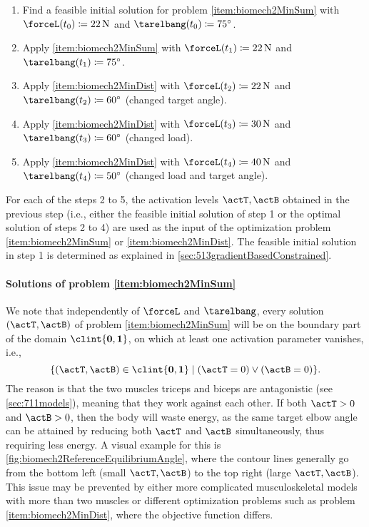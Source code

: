 \begin{enumerate}
  \item
  Find a feasible initial solution for problem \ref{item:biomech2MinSum}
  with $\forceL(t_0) \ceq \SI{22}{\newton}$ and
  $\tarelbang(t_0) \ceq \ang{75}$.
  
  \item
  Apply \ref{item:biomech2MinSum} with $\forceL(t_1) \ceq \SI{22}{\newton}$ and
  $\tarelbang(t_1) \ceq \ang{75}$.
  
  \item
  Apply \ref{item:biomech2MinDist} with $\forceL(t_2) \ceq \SI{22}{\newton}$ and
  $\tarelbang(t_2) \ceq \ang{60}$ (changed target angle).
  
  \item
  Apply \ref{item:biomech2MinDist} with $\forceL(t_3) \ceq \SI{30}{\newton}$ and
  $\tarelbang(t_3) \ceq \ang{60}$ (changed load).
  
  \item
  Apply \ref{item:biomech2MinDist} with $\forceL(t_4) \ceq \SI{40}{\newton}$ and
  $\tarelbang(t_4) \ceq \ang{50}$ (changed load and target angle).
\end{enumerate}
%
For each of the steps 2 to 5, the activation levels $\actT, \actB$ obtained
in the previous step (i.e., either the feasible initial solution
of step 1 or the optimal solution of steps 2 to 4) are used
as the input of the optimization problem
\ref{item:biomech2MinSum} or \ref{item:biomech2MinDist}.
The feasible initial solution in step 1 is determined as explained
in \cref{sec:513gradientBasedConstrained}.

\paragraph{Solutions of problem \ref{item:biomech2MinSum}}

We note that independently of $\forceL$ and $\tarelbang$,
every solution $(\actT, \actB)$ of problem \ref{item:biomech2MinSum} will be
on the boundary part of the domain $\clint{\*0, \*1}$,
on which at least one activation parameter vanishes, i.e.,
\begin{equation}
  \{(\actT, \actB) \in \clint{\*0, \*1} \mid
  (\actT = 0) \lor (\actB = 0)\}.
\end{equation}
The reason is that the two muscles triceps and biceps are antagonistic
(see \cref{sec:711models}), meaning that they work against each other.
If both $\actT > 0$ and $\actB > 0$, then the body will waste energy,
as the same target elbow angle can be attained by reducing both
$\actT$ and $\actB$ simultaneously, thus requiring less energy.
A visual example for this is \cref{fig:biomech2ReferenceEquilibriumAngle},
where the contour lines generally go from the bottom left
(small $\actT, \actB$) to the top right (large $\actT, \actB$).
This issue may be prevented by either
more complicated musculoskeletal models with more
than two muscles or different optimization problems
such as problem \ref{item:biomech2MinDist},
where the objective function differs.

